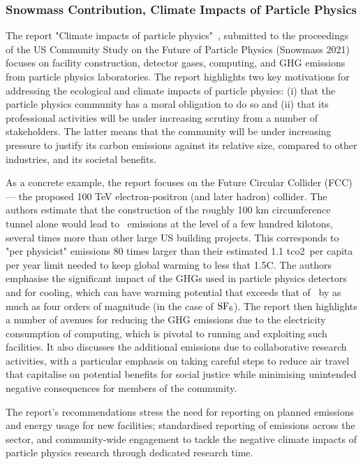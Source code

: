 \documentclass[../SustainableHEP.tex]{subfiles}
\begin{document}

\subsubsection{Snowmass Contribution, Climate Impacts of Particle Physics}

The report "Climate impacts of particle physics"~\cite{Bloom:2022gux}, submitted to the proceedings of the US Community Study on the Future of Particle Physics (Snowmass 2021) focuses on facility construction, detector gases, computing, and GHG emissions from particle physics laboratories. 
The report highlights two key motivations for addressing the ecological and climate impacts of particle physics: (i) that the particle physics community has a moral obligation to do so and (ii) that its professional activities will be under increasing scrutiny from a number of stakeholders. 
The latter means that the community will be under increasing pressure to justify its carbon emissions against its relative size, compared to other industries, and its societal benefits.

As a concrete example, the report focuses on the Future Circular Collider (FCC) --- the proposed 100 TeV electron-positron (and later hadron) collider. 
The authors estimate that the construction of the roughly 100 km circumference tunnel alone would lead to \CdO\ emissions at the level of a few hundred kilotons, several times more than other large US building projects.
This corresponds to "per physicist" emissions 80 times larger than their estimated 1.1 \acrshort{tco2}\ per capita per year limit needed to keep global warming to less that 1.5\degree C. The authors emphasise the significant impact of the GHGs used in particle physics detectors and for cooling, which can have warming potential that exceeds that of \CdO\ by as much as four orders of magnitude (in the case of ${\rm SF}_6$).  
The report then highlights a number of avenues for reducing the GHG emissions due to the electricity consumption of computing, which is pivotal to running and exploiting such facilities. It also discusses the additional emissions due to collaborative research activities, with a particular emphasis on taking careful steps to reduce air travel that capitalise on potential benefits for social justice while minimising unintended negative consequences for members of the community.

The report's recommendations stress the need for reporting on planned emissions and energy usage for new facilities; standardised reporting of emissions across the sector, and community-wide engagement to tackle the negative climate impacts of particle physics research through dedicated research time.
\end{document}
